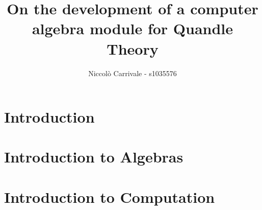 \documentclass{mcom-l}
\begin{document}
\title{On the development of a computer algebra module for Quandle Theory}

\author{Niccolò Carrivale - s1035576}

\maketitle






\section{Introduction}


\section{Introduction to Algebras}





\section{Introduction to Computation}




\end{document}

